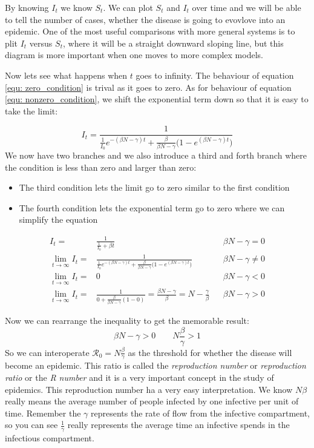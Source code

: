 \documentclass[fontsize=17pt]{article}
\begin{document}
By knowing $I_{t}$ we know $S_{t}$. We can plot $S_{t}$ and $I_{t}$ over time and we will be able to tell the number of cases, whether the disease is going to evovlove into an epidemic. One of the most useful comparisons with more general systems is to plit $I_{t}$ versus $S_{t}$, where it will be a straight downward sloping line, but this diagram is more important when one moves to more complex models.

Now lets see what happens when $t$ goes to infinity. The behaviour of equation \ref{equ: zero_condition} is trival as it goes to zero. As for behaviour of equation \ref{equ: nonzero_condition}, we shift the exponential term down so that it is easy to take the limit:

\begin{equation}
	I_{t}=\frac{1}{\frac{1}{I_{0}}e^{-(\beta N- \gamma)t}+\frac{\beta}{\beta N-\gamma}\Big(1-e^{(\beta N- \gamma)t}\Big)}
\end{equation}
We now have two branches and we also introduce a third and forth branch where the condition is less than zero and larger than zero:
\begin{itemize}
	\item The third condition lets the limit go to zero similar to the first condition
	\item The fourth condition lets the exponential term go to zero where we can simplify the equation
\end{itemize}
\begin{align}
\label{equ: zero_conditionv2}I_{t}=&\frac{1}{\frac{1}{I_{0}}+\beta t}&& \beta N -\gamma=0\\
\label{equ: nonzero_conditionv2}\lim_{t \to \infty}I_{t}=&\frac{1}{\frac{1}{I_{0}}e^{-(\beta N- \gamma)t}+\frac{\beta}{\beta N-\gamma}\Big(1-e^{(\beta N- \gamma)t}\Big)}&&\beta N -\gamma \neq 0\\
\lim_{t \to \infty}I_{t}=&0&&\beta N -\gamma < 0\\
\lim_{t \to \infty}I_{t}=&\frac{1}{0+\frac{\beta}{\beta N-\gamma}(1-0)}=\frac{\beta N- \gamma}{\beta}=N-\frac{\gamma}{\beta}&&\beta N -\gamma > 0
\end{align}

Now we can rearrange the inequality to get the memorable result:
\begin{equation}
\beta N -\gamma > 0 \qquad N\frac{\beta}{\gamma}>1
\end{equation}
So we can interoperate $\mathscr{R}_{0}=N\frac{\beta}{\gamma}$ as the threshold for whether the disease will become an epidemic. This ratio is called the \textit{reproduction number} or \textit{reproduction ratio} or the \textit{R number} and it is a very important concept in the study of epidemics. This reproduction number ha a very easy interpretation. We know $N\beta$ really means the average number of people infected by one infective per unit of time. Remember the $\gamma$ represents the rate of flow from the infective compartment, so you can see $\frac{1}{\gamma}$ really represents the average time an infective spends in the infectious compartment.
\end{document}
